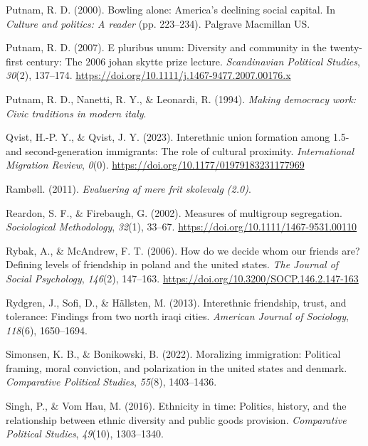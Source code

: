 \documentclass[
]{book}
\newlength{\cslhangindent}
\newenvironment{CSLReferences}[2] %
 {\begin{list}{}{%
  \setlength{\itemindent}{0pt}
  \setlength{\leftmargin}{0pt}
  \setlength{\parsep}{0pt}
  \ifodd #1
   \setlength{\leftmargin}{\cslhangindent}
   \setlength{\itemindent}{-1\cslhangindent}
  \fi
  \setlength{\itemsep}{#2\baselineskip}}}
 {\end{list}}
\begin{document}
\begin{CSLReferences}{1}{0}
Putnam, R. D. (2000). Bowling alone: America's declining social capital. In \emph{Culture and politics: A reader} (pp. 223--234). Palgrave Macmillan US.

Putnam, R. D. (2007). E pluribus unum: Diversity and community in the twenty-first century: The 2006 johan skytte prize lecture. \emph{Scandinavian Political Studies}, \emph{30}(2), 137--174. \url{https://doi.org/10.1111/j.1467-9477.2007.00176.x}

Putnam, R. D., Nanetti, R. Y., \& Leonardi, R. (1994). \emph{Making democracy work: Civic traditions in modern italy}.

Qvist, H.-P. Y., \& Qvist, J. Y. (2023). Interethnic union formation among 1.5- and second-generation immigrants: The role of cultural proximity. \emph{International Migration Review}, \emph{0}(0). \url{https://doi.org/10.1177/01979183231177969}

Rambøll. (2011). \emph{Evaluering af mere frit skolevalg (2.0)}.

Reardon, S. F., \& Firebaugh, G. (2002). Measures of multigroup segregation. \emph{Sociological Methodology}, \emph{32}(1), 33--67. \url{https://doi.org/10.1111/1467-9531.00110}

Rybak, A., \& McAndrew, F. T. (2006). How do we decide whom our friends are? Defining levels of friendship in poland and the united states. \emph{The Journal of Social Psychology}, \emph{146}(2), 147--163. \url{https://doi.org/10.3200/SOCP.146.2.147-163}

Rydgren, J., Sofi, D., \& Hällsten, M. (2013). Interethnic friendship, trust, and tolerance: Findings from two north iraqi cities. \emph{American Journal of Sociology}, \emph{118}(6), 1650--1694.

Simonsen, K. B., \& Bonikowski, B. (2022). Moralizing immigration: Political framing, moral conviction, and polarization in the united states and denmark. \emph{Comparative Political Studies}, \emph{55}(8), 1403--1436.

Singh, P., \& Vom Hau, M. (2016). Ethnicity in time: Politics, history, and the relationship between ethnic diversity and public goods provision. \emph{Comparative Political Studies}, \emph{49}(10), 1303--1340.


\end{CSLReferences}
\end{document}
